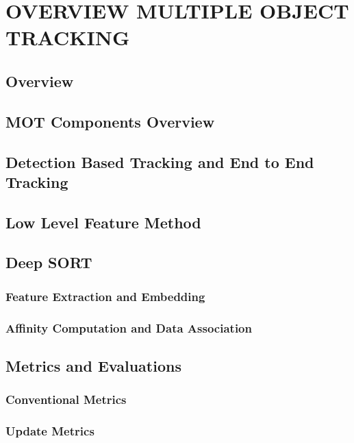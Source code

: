 \chapter{OVERVIEW MULTIPLE OBJECT TRACKING}

\renewcommand{\headrulewidth}{0.5pt}
\renewcommand{\footrulewidth}{0.5pt}
\thispagestyle{plain}
\pagestyle{fancy}
\fancyhf{}
\raggedright
{}

\section{Overview}

\section{MOT Components Overview}

\section{Detection Based Tracking and End to End Tracking}

\section{Low Level Feature Method}

\section{Deep SORT}

    \subsection{Feature Extraction and Embedding}

    \subsection{Affinity Computation and Data Association}

\section{Metrics and Evaluations}

    \subsection{Conventional Metrics}

    \subsection{Update Metrics}